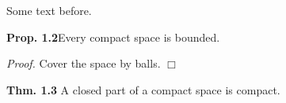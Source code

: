 \documentclass{article}
\begin{document}
Some text before.

{\bf Prop. 1.2}\quad Every compact space is bounded.

{\it Proof.} Cover the space by balls. $\Box$

{\bf Thm. 1.3} A closed part of a compact space is compact.
\end{document}
